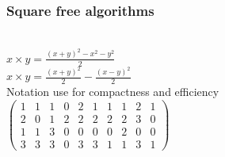 \newpage
\subsubsection{Square free algorithms}

\cite{indocrypt-2011-clavier}\\

$x \times y = \frac{(x+y)^2-x^2-y^2}{2}$\\

$x \times y = \frac{(x+y)^2}{2}-\frac{(x-y)^2}{2}$\\

Notation use for compactness and efficiency\\

$
\begin{pmatrix}
1 & 1 & 1 & 0 & 2 & 1 & 1 & 1 & 2 & 1\\
2 & 0 & 1 & 2 & 2 & 2 & 2 & 2 & 3 & 0\\
1 & 1 & 3 & 0 & 0 & 0 & 0 & 2 & 0 & 0\\
3 & 3 & 3 & 0 & 3 & 3 & 1 & 1 & 3 & 1
\end{pmatrix}
$

%
%
%
